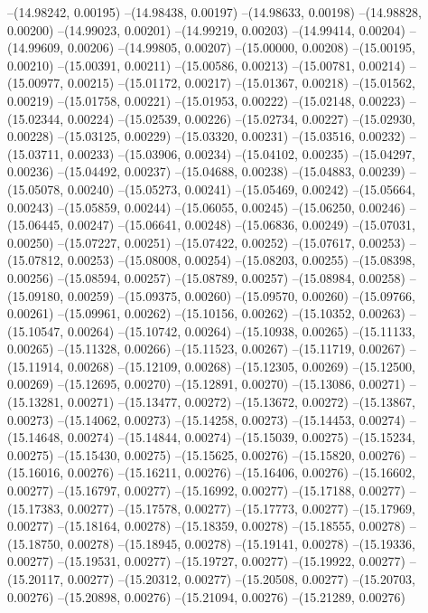--(14.98242, 0.00195)
--(14.98438, 0.00197)
--(14.98633, 0.00198)
--(14.98828, 0.00200)
--(14.99023, 0.00201)
--(14.99219, 0.00203)
--(14.99414, 0.00204)
--(14.99609, 0.00206)
--(14.99805, 0.00207)
--(15.00000, 0.00208)
--(15.00195, 0.00210)
--(15.00391, 0.00211)
--(15.00586, 0.00213)
--(15.00781, 0.00214)
--(15.00977, 0.00215)
--(15.01172, 0.00217)
--(15.01367, 0.00218)
--(15.01562, 0.00219)
--(15.01758, 0.00221)
--(15.01953, 0.00222)
--(15.02148, 0.00223)
--(15.02344, 0.00224)
--(15.02539, 0.00226)
--(15.02734, 0.00227)
--(15.02930, 0.00228)
--(15.03125, 0.00229)
--(15.03320, 0.00231)
--(15.03516, 0.00232)
--(15.03711, 0.00233)
--(15.03906, 0.00234)
--(15.04102, 0.00235)
--(15.04297, 0.00236)
--(15.04492, 0.00237)
--(15.04688, 0.00238)
--(15.04883, 0.00239)
--(15.05078, 0.00240)
--(15.05273, 0.00241)
--(15.05469, 0.00242)
--(15.05664, 0.00243)
--(15.05859, 0.00244)
--(15.06055, 0.00245)
--(15.06250, 0.00246)
--(15.06445, 0.00247)
--(15.06641, 0.00248)
--(15.06836, 0.00249)
--(15.07031, 0.00250)
--(15.07227, 0.00251)
--(15.07422, 0.00252)
--(15.07617, 0.00253)
--(15.07812, 0.00253)
--(15.08008, 0.00254)
--(15.08203, 0.00255)
--(15.08398, 0.00256)
--(15.08594, 0.00257)
--(15.08789, 0.00257)
--(15.08984, 0.00258)
--(15.09180, 0.00259)
--(15.09375, 0.00260)
--(15.09570, 0.00260)
--(15.09766, 0.00261)
--(15.09961, 0.00262)
--(15.10156, 0.00262)
--(15.10352, 0.00263)
--(15.10547, 0.00264)
--(15.10742, 0.00264)
--(15.10938, 0.00265)
--(15.11133, 0.00265)
--(15.11328, 0.00266)
--(15.11523, 0.00267)
--(15.11719, 0.00267)
--(15.11914, 0.00268)
--(15.12109, 0.00268)
--(15.12305, 0.00269)
--(15.12500, 0.00269)
--(15.12695, 0.00270)
--(15.12891, 0.00270)
--(15.13086, 0.00271)
--(15.13281, 0.00271)
--(15.13477, 0.00272)
--(15.13672, 0.00272)
--(15.13867, 0.00273)
--(15.14062, 0.00273)
--(15.14258, 0.00273)
--(15.14453, 0.00274)
--(15.14648, 0.00274)
--(15.14844, 0.00274)
--(15.15039, 0.00275)
--(15.15234, 0.00275)
--(15.15430, 0.00275)
--(15.15625, 0.00276)
--(15.15820, 0.00276)
--(15.16016, 0.00276)
--(15.16211, 0.00276)
--(15.16406, 0.00276)
--(15.16602, 0.00277)
--(15.16797, 0.00277)
--(15.16992, 0.00277)
--(15.17188, 0.00277)
--(15.17383, 0.00277)
--(15.17578, 0.00277)
--(15.17773, 0.00277)
--(15.17969, 0.00277)
--(15.18164, 0.00278)
--(15.18359, 0.00278)
--(15.18555, 0.00278)
--(15.18750, 0.00278)
--(15.18945, 0.00278)
--(15.19141, 0.00278)
--(15.19336, 0.00277)
--(15.19531, 0.00277)
--(15.19727, 0.00277)
--(15.19922, 0.00277)
--(15.20117, 0.00277)
--(15.20312, 0.00277)
--(15.20508, 0.00277)
--(15.20703, 0.00276)
--(15.20898, 0.00276)
--(15.21094, 0.00276)
--(15.21289, 0.00276)

